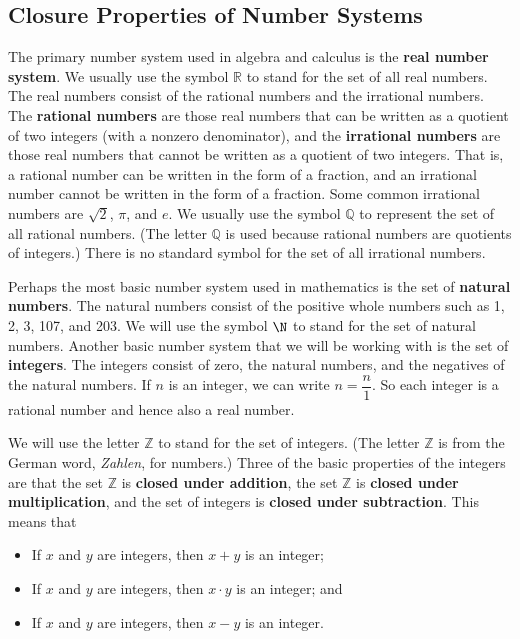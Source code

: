\subsection*{Closure Properties of Number Systems}\label{ss:closure} 
%
The primary number system used in algebra and calculus is the \textbf{real number system}.
%
  We usually use the symbol $\mathbb{R}$ 
\label{sym:reals}%
 to stand for the set of all real numbers.  The real numbers consist of the rational numbers
%
 and the irrational numbers.
%
  The \textbf{rational numbers} are those real numbers that can be written as a quotient of two integers (with a nonzero denominator), and the \textbf{irrational numbers} are those real numbers that cannot be written as a quotient of two integers.   That is, a rational number can be written in the form of a fraction, and an irrational number cannot be written in the form of a fraction.  Some common irrational numbers are $\sqrt{2}$, $\pi$, and $e$.  We usually use the symbol $\mathbb{Q}$  to represent the set of all rational numbers.  (The letter $\mathbb{Q}$ 
\label{sym:rationals}%
is used because rational numbers are quotients of integers.)  There is no standard symbol for the set of all irrational numbers.

Perhaps the most basic number system used in mathematics is the set of 
\textbf{natural numbers}.
%
The natural numbers consist of the positive whole numbers such as 1, 2, 3, 107, and 203.  We will use the symbol $\N$ 
\label{sym:natural}%
to stand for the set of natural numbers.  Another basic number system that we will be working with is the set of 
\textbf{integers}.
%
  The integers consist of zero, the natural numbers, and the negatives of the natural numbers.  If  $n$  is an integer, we can write  $n = \dfrac{n}{1}$.  So each integer is a rational number and hence also a real number.

We will use the letter  $\mathbb{Z}$ 
\label{sym:integers}%
 to stand for the set of integers.  (The letter  $\mathbb{Z}$ is from the German word, \emph{Zahlen}, for numbers.)  Three of the basic properties of the integers are that  the set  $\mathbb{Z}$ is \textbf{closed under addition}, 
%
the set  $\mathbb{Z}$ is \textbf{closed under multiplication}, 
%
and the set of integers is \textbf{closed under subtraction}.  
%
This means that
\begin{itemize}
  \item If  $x$  and  $y$  are integers, then  $x + y$ is an integer;

  \item If  $x$  and  $y$  are integers, then  $x \cdot y$ is an integer; and

  \item If  $x$  and  $y$  are integers, then  $x - y$ is an integer.

\end{itemize}

